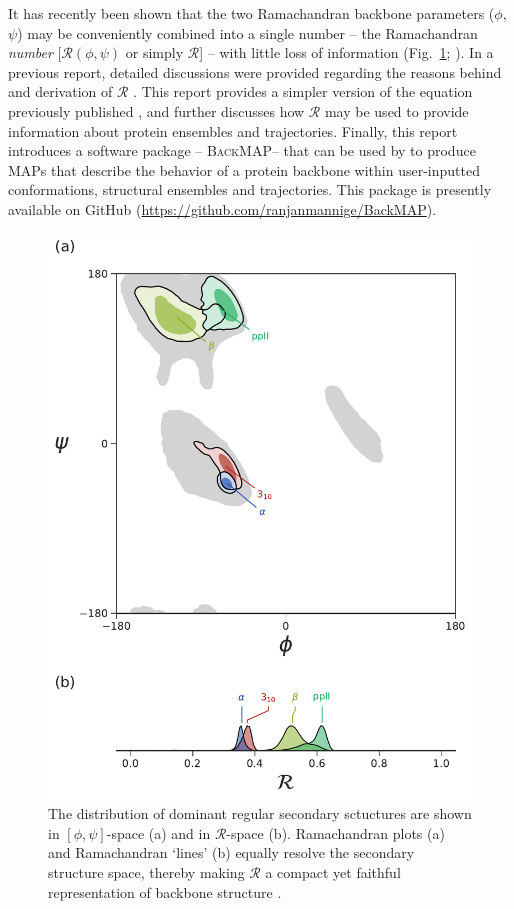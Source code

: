 \documentclass[fleqn,10pt,lineno]{wlpeerj} %
\newcommand{\Fig}[1]{Fig.~\ref{#1}}
\newcommand{\gname}{BackMAP}
\newcommand{\pname}{\textsc{\gname}\xspace}
\newcommand{\rr}{$\mathcal{R}$\xspace}
\begin{document}
It has recently been shown that the two Ramachandran backbone parameters ($\phi$,$\psi$) may be conveniently combined into a single number -- the Ramachandran \textit{number} [$\mathcal{R}(\phi,\psi)$ or simply $\mathcal{R}$] -- with little loss of information (\Fig{fig:ramasecondary}; \cite{Mannige2016}). 
In a previous report, detailed discussions were provided regarding the reasons behind and derivation of $\mathcal{R}$ \citep{Mannige2016}. This report provides a simpler version of the equation previously published \citep{Mannige2016}, and further discusses how $\mathcal{R}$ may be used to provide information about protein ensembles and trajectories. 
Finally, this report introduces a software package -- \pname -- that can be used by to produce MAPs that describe the behavior of a protein backbone within user-inputted conformations, structural ensembles and trajectories. This package is presently available on GitHub (\url{https://github.com/ranjanmannige/\gname}).


\begin{figure}[t!]
\begin{adjustwidth}{-1in}{0in} %
\centering
\includegraphics[width=0.6\linewidth]{automated_figures/fig_ss_2d_1d.pdf}
\caption{The distribution of dominant regular secondary sctuctures are shown in $[\phi,\psi]$-space (a) and in $\mathcal{R}$-space (b). Ramachandran plots (a) and Ramachandran `lines' (b) equally resolve the secondary structure space, thereby making \rr a compact yet faithful representation of backbone structure \citep{Mannige2016}.\label{fig:ramasecondary}} 
\end{adjustwidth}
\end{figure}
\end{document}
